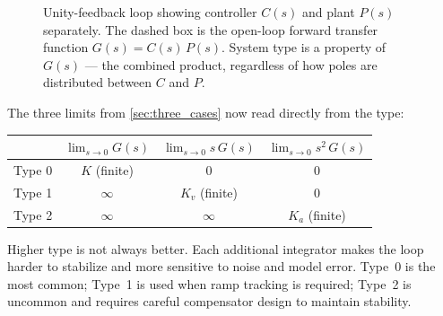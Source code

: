 \documentclass[../../book.tex]{subfiles}
\begin{document}
\begin{figure}[htbp]
\centering
{}
\caption{Unity-feedback loop showing controller $C(s)$ and plant $P(s)$
  separately.  The dashed box is the open-loop forward transfer function
  $G(s) = C(s)\,P(s)$.  System type is a property of $G(s)$ --- the combined
  product, regardless of how poles are distributed between $C$ and $P$.}
\label{fig:cl_with_type}
\end{figure}

The three limits from \cref{sec:three_cases} now read directly from the type:

\begin{center}
\begin{tabular}{lccc}
\toprule
 & $\lim_{s\to 0} G(s)$ & $\lim_{s\to 0} s\,G(s)$ & $\lim_{s\to 0} s^2\,G(s)$ \\
\midrule
Type 0 & $K$ (finite) & $0$          & $0$          \\
Type 1 & $\infty$     & $K_v$ (finite) & $0$          \\
Type 2 & $\infty$     & $\infty$     & $K_a$ (finite) \\
\bottomrule
\end{tabular}
\end{center}

Higher type is not always better.  Each additional integrator makes the loop
harder to stabilize and more sensitive to noise and model error.  Type~0 is
the most common; Type~1 is used when ramp tracking is required; Type~2 is
uncommon and requires careful compensator design to maintain stability.
\end{document}
